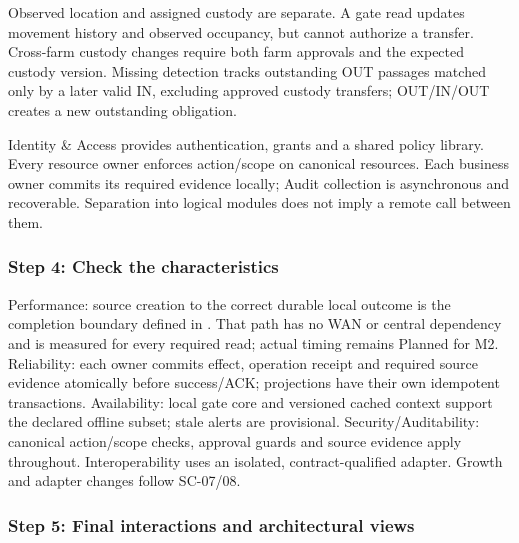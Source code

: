 Observed location and assigned custody are separate. A gate read updates
movement history and observed occupancy, but cannot authorize a
transfer. Cross-farm custody changes require both farm approvals and the
expected custody version. Missing detection tracks outstanding OUT
passages matched only by a later valid IN, excluding approved custody
transfers; OUT/IN/OUT creates a new outstanding obligation.

Identity \& Access provides authentication, grants and a shared policy
library. Every resource owner enforces action/scope on canonical
resources. Each business owner commits its required evidence locally;
Audit collection is asynchronous and recoverable. Separation into
logical modules does not imply a remote call between them.

\subsubsection{Step 4: Check the characteristics}

Performance: source creation to the correct durable local outcome is the
completion boundary defined in
. That path has no WAN or central dependency
and is measured for every required read; actual timing remains Planned
for M2. Reliability: each owner commits effect, operation receipt and
required source evidence atomically before success/ACK; projections have
their own idempotent transactions. Availability: local gate core and
versioned cached context support the declared offline subset; stale
alerts are provisional. Security/Auditability: canonical action/scope
checks, approval guards and source evidence apply throughout.
Interoperability uses an isolated, contract-qualified adapter. Growth
and adapter changes follow SC-07/08.

\subsubsection{Step 5: Final interactions and architectural views}

